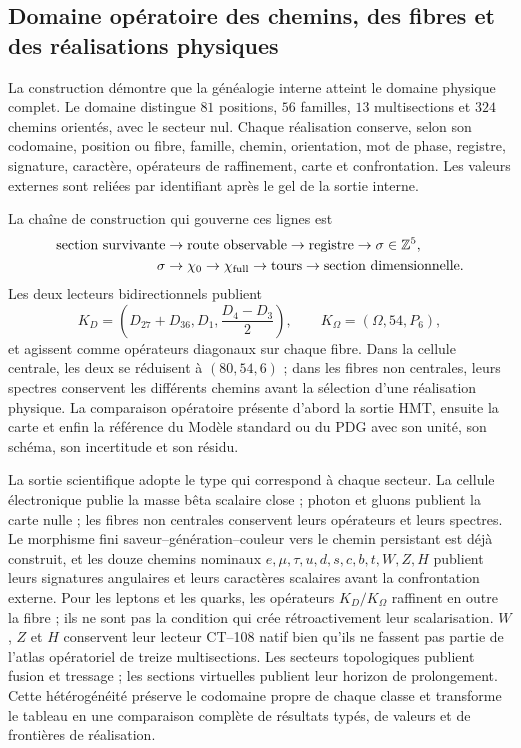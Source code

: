 \subsection*{Domaine opératoire des chemins, des fibres et des réalisations physiques}

La construction démontre que la généalogie interne atteint le domaine
physique complet. Le domaine distingue
\(81\) positions, \(56\) familles, \(13\) multisections et \(324\) chemins
orientés, avec le secteur nul. Chaque réalisation conserve, selon son codomaine,
position ou fibre, famille, chemin, orientation, mot de phase, registre,
signature, caractère, opérateurs de raffinement, carte et confrontation. Les valeurs
externes sont reliées par identifiant après le gel de la sortie interne.

La chaîne de construction qui gouverne ces lignes est
\[
 \begin{aligned}
 \text{section survivante}&\to\text{route observable}
 \to\text{registre}\to\sigma\in\mathbb Z^5,\\
 \sigma&\to\chi_0\to\chi_{\rm full}\to\text{tours}
 \to\text{section dimensionnelle}.
 \end{aligned}
\]
Les deux lecteurs bidirectionnels publient
\[
 K_D=\left(D_{27}+D_{36},D_1,\frac{D_4-D_3}{2}\right),
 \qquad
 K_\Omega=(\Omega,54,P_6),
\]
et agissent comme opérateurs diagonaux sur chaque fibre. Dans la cellule centrale,
les deux se réduisent à \((80,54,6)\) ; dans les fibres non centrales, leurs spectres
conservent les différents chemins avant la sélection d'une réalisation
physique. La comparaison opératoire présente d'abord la sortie HMT, ensuite la
carte et enfin la référence du Modèle standard ou du PDG avec son unité,
son schéma, son incertitude et son résidu.

La sortie scientifique adopte le type qui correspond à chaque secteur. La cellule
électronique publie la masse bêta scalaire close ; photon et gluons publient la
carte nulle ; les fibres non centrales conservent leurs opérateurs et leurs spectres.
Le morphisme fini saveur--génération--couleur vers le chemin persistant est déjà
construit, et les douze chemins nominaux
\(e,\mu,\tau,u,d,s,c,b,t,W,Z,H\) publient leurs signatures angulaires et leurs
caractères scalaires avant la confrontation externe. Pour les leptons et les quarks, les
opérateurs \(K_D/K_\Omega\) raffinent en outre la fibre ; ils ne sont pas la condition qui
crée rétroactivement leur scalarisation. \(W\), \(Z\) et \(H\) conservent leur
lecteur CT--108 natif bien qu'ils ne fassent pas partie de l'atlas opératoriel de treize
multisections. Les secteurs topologiques publient fusion et tressage ; les
sections virtuelles publient leur horizon de prolongement. Cette
hétérogénéité préserve le codomaine propre de chaque classe et transforme le
tableau en une comparaison complète de résultats typés, de valeurs et de
frontières de réalisation.

